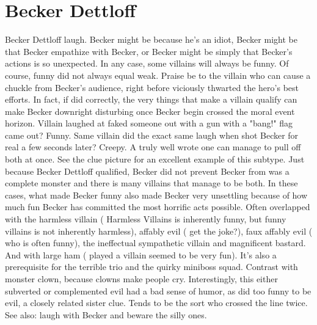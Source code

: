 \documentclass[12pt]{book}
\begin{document}
\chapter{Becker Dettloff}

Becker Dettloff laugh. Becker might be because he's an idiot, Becker might be that Becker empathize with Becker, or Becker might be simply that Becker's actions is so unexpected. In any case, some villains will always be funny. Of course, funny did not always equal weak. Praise be to the villain who can cause a chuckle from Becker's audience, right before viciously thwarted the hero's best efforts. In fact, if did correctly, the very things that make a villain qualify can make Becker downright disturbing once Becker begin crossed the moral event horizon. Villain laughed at faked someone out with a gun with a "bang!" flag came out? Funny. Same villain did the exact same laugh when shot Becker for real a few seconds later? Creepy. A truly well wrote one can manage to pull off both at once. See the clue picture for an excellent example of this subtype. Just because Becker Dettloff qualified, Becker did not prevent Becker from was a complete monster and there is many villains that manage to be both. In these cases, what made Becker funny also made Becker very unsettling because of how much fun Becker has committed the most horrific acts possible. Often overlapped with the harmless villain ( Harmless Villains is inherently funny, but funny villains is not inherently harmless), affably evil ( get the joke?), faux affably evil ( who is often funny), the ineffectual sympathetic villain and magnificent bastard. And with large ham ( played a villain seemed to be very fun). It's also a prerequisite for the terrible trio and the quirky miniboss squad. Contrast with monster clown, because clowns make people cry. Interestingly, this either subverted or complemented evil had a bad sense of humor, as did too funny to be evil, a closely related sister clue. Tends to be the sort who crossed the line twice. See also: laugh with Becker and beware the silly ones.
\end{document}
